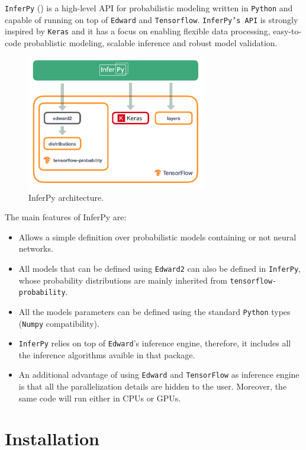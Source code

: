 
\texttt{InferPy} (\cite{cozar2019inferpy}) is a high-level API for probabilistic modeling written in \texttt{Python} and capable of running on top of \texttt{Edward} and \texttt{Tensorflow}. \texttt{InferPy's API} is strongly inspired by \texttt{Keras} and it has a focus on enabling flexible data processing, easy-to-code probablistic modeling, scalable inference and robust model validation.

\begin{figure}[h!]
    \centering
    \includegraphics[width=0.7\textwidth]{Chapters/InferPy/arch.png}
    \caption{InferPy architecture.}
\end{figure}

The main features of InferPy are:
\begin{itemize}
    \item Allows a simple definition over probabilistic models containing or not neural networks.
    \item All models that can be defined using \texttt{Edward2} can also be defined in  \texttt{InferPy}, whose probability distributions are mainly inherited from \texttt{tensorflow-probability}.
    \item All the models parameters can be defined using the standard \texttt{Python} types (\texttt{Numpy} compatibility).
    \item \texttt{InferPy} relies on top of \texttt{Edward}'s inference engine, therefore, it includes all the inference algorithms avaible in that package.
    \item An additional advantage of using \texttt{Edward} and \texttt{TensorFlow} as inference engine is that all the parallelization details are hidden to the user. Moreover, the same code will run either in CPUs or GPUs.
\end{itemize}

\section{Installation}

